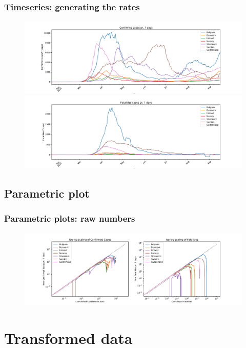 \documentclass{beamer}
\begin{document}
\begin{frame}
\frametitle{Timeseries: generating the rates}
\begin{figure}[H]
\includegraphics[width=\textwidth]{../figs/confirmed_rate_timeseries_7days_linear.pdf}
\includegraphics[width=\textwidth]{../figs/deaths_rate_timeseries_7days_linear.pdf}
\end{figure}
\end{frame}

\subsection{Parametric plot}
\begin{frame}
\frametitle{Parametric plots: raw numbers}
\begin{figure}[H]
\includegraphics[width=\textwidth]{../figs/parametric_plots_log.pdf}
\end{figure}
\end{frame}

\section{Transformed data}
\end{document}
